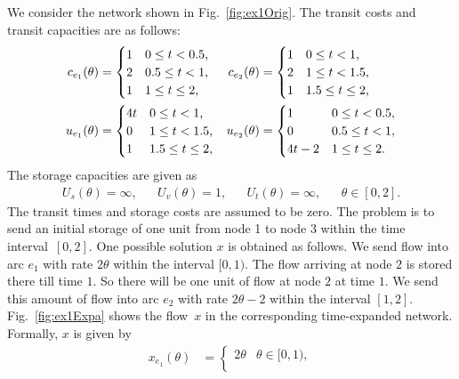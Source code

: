 \documentclass{svjour3}                     \smartqed
\begin{document}
\begin{example}
We consider the network shown in Fig.~\ref{fig:ex1Orig}.
The transit costs and transit capacities are as follows:
\begin{align*}
c_{e_1}(\theta)&=\begin{cases}
            1&\hbox{$0\leq t< 0.5$,}\\
            2&\hbox{$0.5\leq t< 1$,}\\
            1&\hbox{$1\leq t\leq 2$,}
            \end{cases}&
c_{e_2}(\theta)&=\begin{cases}
            1&\hbox{$0\leq t< 1$,}\\
            2&\hbox{$1\leq t< 1.5$,}\\
            1&\hbox{$1.5\leq t\leq 2$,}
            \end{cases}\\
u_{e_1}(\theta)&=\begin{cases}
            4t&\hbox{$0\leq t< 1$,}\\
            0&\hbox{$1\leq t< 1.5$,}\\
            1&\hbox{$1.5\leq t\leq 2$,}
            \end{cases}&
u_{e_2}(\theta)&=\begin{cases}
            1&0\leq t< 0.5,\\
            0&0.5\leq t< 1,\\
            4t-2&1\leq t\leq 2.
            \end{cases}
\end{align*}
The storage capacities are given as
\begin{align*}
U_s(\theta)=\infty,&& U_v(\theta)=1,&& U_t(\theta)=\infty,&& \theta\in [0,2].
\end{align*}
The transit times and storage costs are assumed to be zero. The problem is to send an initial storage of one
unit from node 1 to node 3 within the time interval~$[0,2]$. One possible solution $x$ is obtained as follows. We send flow into arc $e_1$ with rate $2\theta$ within the interval $[0,1)$. The flow arriving at node $2$ is stored there till time $1$. So there will be one unit of flow at node $2$ at time $1$. We send this amount of flow into arc $e_2$ with rate $2\theta-2$ within the interval $[1,2]$. Fig.~\ref{fig:ex1Expa} shows the flow~$x$ in the corresponding time-expanded network.
Formally, $x$ is given by
\begin{align*}
x_{e_1}(\theta)&=\begin{cases}
            2\theta&\theta\in [0,1),\\

\end{cases}
\end{align*}
\end{example}
\end{document}
